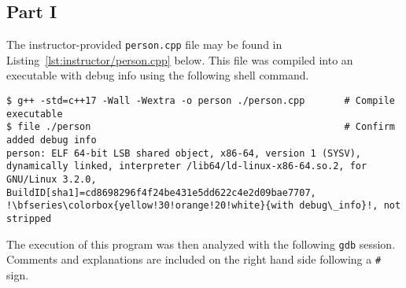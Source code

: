 \documentclass[11pt, letterpaper]{article} %
\begin{document}
\subsection*{Part I}
The instructor-provided \texttt{person.cpp} file may be found in Listing~\ref{lst:instructor/person.cpp} below. This file was compiled into an executable with debug info using the following shell command.
\begin{lstlisting}[style=labreportstyle-sh,escapechar=!]
$ g++ -std=c++17 -Wall -Wextra -o person ./person.cpp       # Compile executable
$ file ./person                                             # Confirm added debug info
person: ELF 64-bit LSB shared object, x86-64, version 1 (SYSV), dynamically linked, interpreter /lib64/ld-linux-x86-64.so.2, for GNU/Linux 3.2.0, BuildID[sha1]=cd8698296f4f24be431e5dd622c4e2d09bae7707, !\bfseries\colorbox{yellow!30!orange!20!white}{with debug\_info}!, not stripped
\end{lstlisting}
The execution of this program was then analyzed with the following \texttt{gdb} session. Comments and explanations are included on the right hand side following a \texttt{\#} sign.
\end{document}
